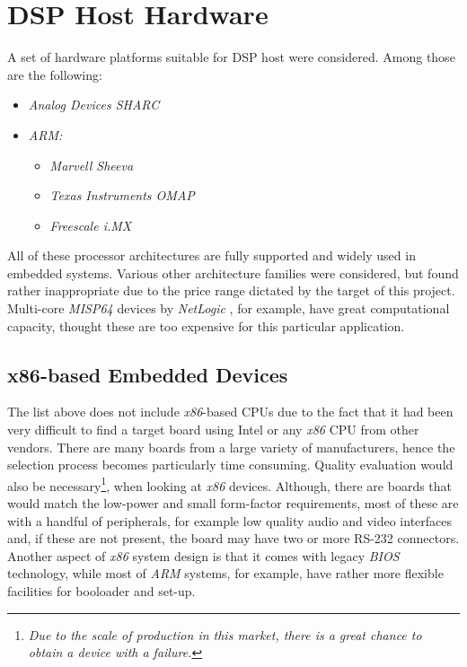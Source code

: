 \section{DSP Host Hardware}

  A set of hardware platforms suitable for DSP host were considered.
 Among those are the following:
 	\begin{itemize}
		\item \emph{Analog Devices SHARC}
		\item \emph{ARM:} \begin{itemize}
		\item \emph{Marvell Sheeva}
		\item \emph{Texas Instruments OMAP}
		\item \emph{Freescale i.MX}
		\end{itemize}
	\end{itemize}
 All of these processor architectures are fully supported and widely
 used in embedded systems. Various other architecture families were
 considered, but found rather inappropriate due to the price range
 dictated by the target of this project. Multi-core \emph{MISP64}
 devices by \emph{NetLogic} \cite{netlogic:mips64:multicore}, for
 example, have great computational capacity, thought these are too
 expensive for this particular application.

\subsection{x86-based Embedded Devices}

  The list above does not include \emph{x86}-based CPUs due to the
 fact that it had been very difficult to find a target board using
 Intel or any \emph{x86} CPU from other vendors. There are many boards
 from a large variety of manufacturers, hence the selection process
 becomes particularly time consuming. Quality evaluation would also
 be necessary\footnote{\emph{Due to the scale of production in this
 market, there is a great chance to obtain a device with a failure.}},
 when looking at \emph{x86} devices. Although, there are boards that
 would match the low-power and small form-factor requirements, most
 of these are with a handful of peripherals, for example low quality
 audio and video interfaces and, if these are not present, the board
 may have two or more RS-232 connectors. Another aspect of \emph{x86}
 system design is that it comes with legacy \emph{BIOS} technology,
 while most of \emph{ARM} systems, for example, have rather more
 flexible facilities for booloader and set-up.


